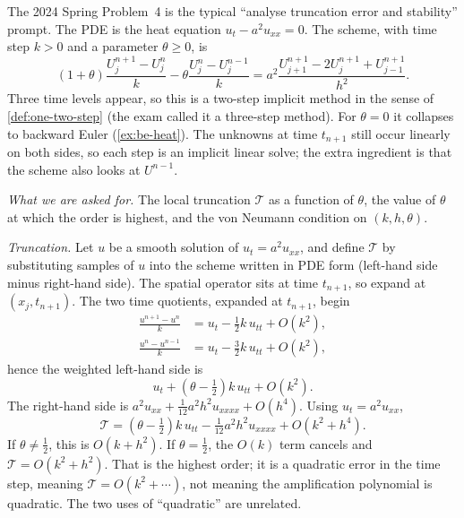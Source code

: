 \documentclass[11pt,a4paper]{article}
\begin{document}
\begin{example}
\label{ex:theta-heat}
The 2024 Spring Problem~4 is the typical ``analyse truncation error and stability'' prompt. The PDE is the heat equation \(u_t-a^2 u_{xx}=0\). The scheme, with time step \(k>0\) and a parameter \(\theta\ge 0\), is
\[
(1+\theta)\frac{U_j^{n+1}-U_j^n}{k}
-
\theta\frac{U_j^n-U_j^{n-1}}{k}
=
a^2\frac{U_{j+1}^{n+1}-2U_j^{n+1}+U_{j-1}^{n+1}}{h^2}.
\]
Three time levels appear, so this is a two-step implicit method in the sense of \cref{def:one-two-step} (the exam called it a three-step method). For \(\theta=0\) it collapses to backward Euler (\cref{ex:be-heat}). The unknowns at time \(t_{n+1}\) still occur linearly on both sides, so each step is an implicit linear solve; the extra ingredient is that the scheme also looks at \(U^{n-1}\).

\emph{What we are asked for.} The local truncation \(\mathcal T\) as a function of \(\theta\), the value of \(\theta\) at which the order is highest, and the von Neumann condition on \((k,h,\theta)\).

\emph{Truncation.} Let \(u\) be a smooth solution of \(u_t=a^2 u_{xx}\), and define \(\mathcal T\) by substituting samples of \(u\) into the scheme written in PDE form (left-hand side minus right-hand side). The spatial operator sits at time \(t_{n+1}\), so expand at \((x_j,t_{n+1})\). The two time quotients, expanded at \(t_{n+1}\), begin
\begin{align*}
\frac{u^{n+1}-u^n}{k}
&=
u_t-\tfrac12 k\,u_{tt}+O(k^2),
\\
\frac{u^n-u^{n-1}}{k}
&=
u_t-\tfrac32 k\,u_{tt}+O(k^2),
\end{align*}
hence the weighted left-hand side is
\[
u_t+(\theta-\tfrac12)k\,u_{tt}+O(k^2).
\]
The right-hand side is \(a^2 u_{xx}+\tfrac{1}{12}a^2 h^2 u_{xxxx}+O(h^4)\). Using \(u_t=a^2 u_{xx}\),
\[
\mathcal T
=
(\theta-\tfrac12)k\,u_{tt}
-
\tfrac{1}{12}a^2 h^2 u_{xxxx}
+
O(k^2+h^4).
\]
If \(\theta\neq\tfrac12\), this is \(O(k+h^2)\). If \(\theta=\tfrac12\), the \(O(k)\) term cancels and \(\mathcal T=O(k^2+h^2)\). That is the highest order; it is a quadratic error in the time step, meaning \(\mathcal T=O(k^2+\cdots)\), not meaning the amplification polynomial is quadratic. The two uses of ``quadratic'' are unrelated.


\end{example}
\end{document}
